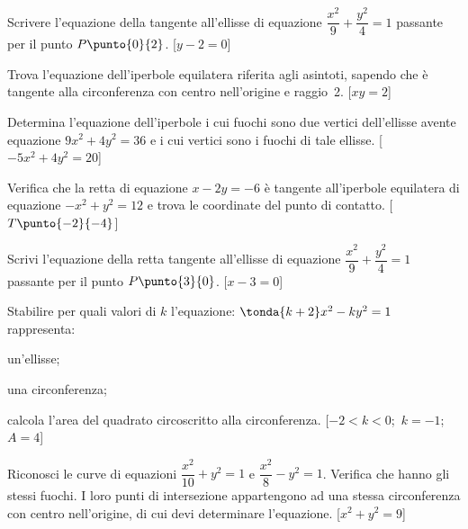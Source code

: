 \begin{esercizio}\label{ese:03.1}
Scrivere l’equazione della tangente all’ellisse di equazione 
\quad \(\dfrac{x^2}{9}+\dfrac{y^2}{4}=1\) \quad
passante per il punto \(P \punto{0}{2}\).
\hfill [\(y-2=0\)]
\end{esercizio}

\begin{esercizio}\label{ese:03.1}
Trova l’equazione dell’iperbole equilatera riferita agli asintoti, 
sapendo che è tangente alla circonferenza con centro nell’origine e 
raggio~2.
\hfill [\(xy=2\)]
\end{esercizio}

\begin{esercizio}\label{ese:03.1}
Determina l’equazione dell’iperbole i cui fuochi sono due vertici 
dell’ellisse avente equazione \quad \(9x^2+4y^2=36\) \quad e i cui vertici 
sono i fuochi di tale ellisse. 
\hfill [\(-5x^2+4y^2=20\)]
\end{esercizio}

\begin{esercizio}\label{ese:03.1}
Verifica che la retta di equazione \quad \(x-2y=-6\) \quad è tangente 
all’iperbole equilatera di equazione \quad \(-x^2+y^2=12\) \quad e trova le 
coordinate del punto di contatto. 
\hfill [\(T\punto{-2}{-4}\)]
\end{esercizio}

\begin{esercizio}\label{ese:03.1}
Scrivi l’equazione della retta tangente all’ellisse di equazione
\quad \(\dfrac{x^2}{9}+\dfrac{y^2}{4}=1\) \quad
passante per il punto \(P\punto{3}{0}\). 
\hfill [\(x-3=0\)]
\end{esercizio}

\begin{esercizio}\label{ese:03.1}
Stabilire per quali valori di \(k\) l’equazione:
\quad \(\tonda{k+2}x^2-ky^2=1\) \quad
rappresenta:
\begin{enumeratea}
\item un’ellisse;
\item una circonferenza;
\item calcola l’area del quadrato circoscritto alla circonferenza.
\hfill [\(-2<k<0\);~\(k=-1\);~\(A=4\)]
\end{enumeratea}
\end{esercizio}

\begin{esercizio}\label{ese:03.1}
Riconosci le curve di equazioni 
\quad \(\dfrac{x^2}{10}+y^2=1\) \quad e \quad \(\dfrac{x^2}{8}-y^2=1\). 
Verifica che hanno gli stessi fuochi. 
I loro punti di intersezione appartengono ad una stessa circonferenza con 
centro nell’origine, di cui devi determinare l’equazione. 
\hfill [\(x^2+y^2=9\)]
\end{esercizio}

